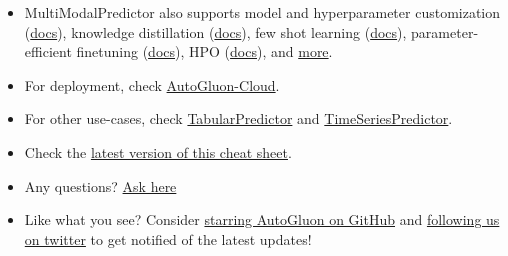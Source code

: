 \begin{itemize}
  \item MultiModalPredictor also supports model and hyperparameter customization (\href{https://auto.gluon.ai/stable/tutorials/multimodal/advanced_topics/customization.html}{docs}), knowledge distillation (\href{https://auto.gluon.ai/stable/tutorials/multimodal/advanced_topics/model_distillation.html}{docs}), few shot learning (\href{https://auto.gluon.ai/stable/tutorials/multimodal/advanced_topics/few_shot_learning.html}{docs}), parameter-efficient finetuning (\href{https://auto.gluon.ai/stable/tutorials/multimodal/advanced_topics/efficient_finetuning_basic.html}{docs}), HPO (\href{https://auto.gluon.ai/stable/tutorials/multimodal/advanced_topics/hyperparameter_optimization.html}{docs}), and \href{https://auto.gluon.ai/stable/tutorials/multimodal/index.html}{more}.
  \item For deployment, check \href{https://auto.gluon.ai/stable/tutorials/cloud_fit_deploy/index.html}{AutoGluon-Cloud}.
  \item For other use-cases, check
  \href{https://auto.gluon.ai/stable/tutorials/tabular_prediction/index.html}{TabularPredictor} and
  \href{https://auto.gluon.ai/stable/tutorials/timeseries/index.html}{TimeSeriesPredictor}.
  \item Check the \href{https://auto.gluon.ai/stable/cheatsheet.html}{latest version of this cheat sheet}.
  \item Any questions? \href{https://github.com/awslabs/autogluon/discussions}{Ask here}
  \item Like what you see? Consider \href{https://github.com/awslabs/autogluon/stargazers}{starring AutoGluon on GitHub} and \href{https://twitter.com/autogluon}{following us on twitter} to get notified of the latest updates!
\end{itemize}


\raggedcolumns


